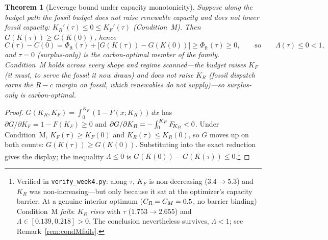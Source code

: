 \documentclass[11pt,reqno]{amsart}
\theoremstyle{plain}
\newtheorem{theorem}{Theorem}
\theoremstyle{definition}
\theoremstyle{remark}
\theoremstyle{remark}\newtheorem{observation}{Observation}
\newcommand{\KR}{K_R}\newcommand{\KF}{K_F}\newcommand{\KM}{K_M}
\begin{document}
\begin{theorem}[Leverage bound under capacity monotonicity]\label{thm:leveragebound}
Suppose along the budget path the fossil budget does not raise renewable capacity and does
not lower fossil capacity: $\KR'(\tau)\le0\le\KF'(\tau)$ (Condition~\textup{M}). Then
$G(K(\tau))\ge G(K(0))$, hence
\[
  C(\tau)-C(0)=\Phi_{\mathrm{ft}}(\tau)+\big[G(K(\tau))-G(K(0))\big]\ge\Phi_{\mathrm{ft}}(\tau)\ge0,
  \qquad\text{so}\qquad \Lambda(\tau)\le0<1,
\]
and $\tau=0$ (surplus-only) is the carbon-optimal member of the family. Condition~\textup{M}
holds across every shape and regime scanned---the budget raises $\KF$ (it must, to serve
the fossil it now draws) and does not raise $\KR$ (fossil dispatch earns the $R-c$ margin
on \emph{fossil}, which renewables do not supply)---so surplus-only is carbon-optimal.
\end{theorem}
\begin{proof}
$G(\KR,\KF)=\int_0^{\KF}(1-F(x;\KR))\,dx$ has $\partial G/\partial\KF=1-F(\KF)\ge0$ and
$\partial G/\partial\KR=-\int_0^{\KF}\FKR<0$. Under Condition~\textup{M},
$\KF(\tau)\ge\KF(0)$ and $\KR(\tau)\le\KR(0)$, so $G$ moves up on both counts:
$G(K(\tau))\ge G(K(0))$. Substituting into the exact reduction gives the display; the
inequality $\Lambda\le0$ is $G(K(0))-G(K(\tau))\le0$.\footnote{Verified in
\texttt{verify\_week4.py}: along $\tau$, $\KF$ is non-decreasing ($3.4\to5.3$) and $\KR$
was non-increasing---but only because it sat at the optimizer's capacity barrier. At a
genuine interior optimum ($C_R=C_M=0.5$, no barrier binding) Condition~M \emph{fails}:
$\KR$ \emph{rises} with $\tau$ ($1.753\to2.655$) and $\Lambda\in[0.139,0.218]>0$. The
conclusion nevertheless survives, $\Lambda<1$; see Remark~\ref{rem:condMfails}.}
\end{proof}
\end{document}
